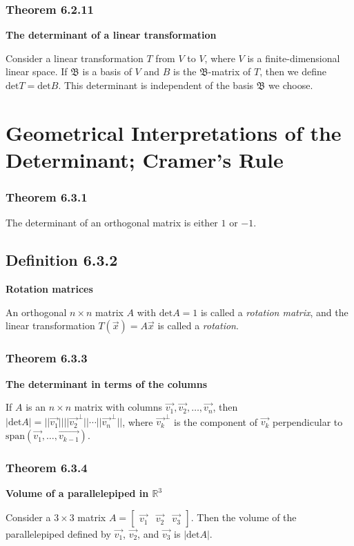 \documentclass{report}
\begin{document}
\subsubsection*{Theorem 6.2.11}
\par\noindent\textbf{The determinant of a linear transformation}
\par\noindent Consider a linear transformation $T$ from $V$ to $V$, where $V$ is a finite-dimensional linear space. If $\mathfrak{B}$ is a basis of $V$ and $B$ is the $\mathfrak{B}$-matrix of $T$, then we define $\textrm{det}T=\textrm{det}B$. This determinant is independent of the basis $\mathfrak{B}$ we choose.

\section{Geometrical Interpretations of the Determinant; Cramer's Rule}
\subsubsection*{Theorem 6.3.1}
\par\noindent The determinant of an orthogonal matrix is either $1$ or $-1$.
\subsection*{Definition 6.3.2}
\par\noindent\textbf{Rotation matrices}
\par\noindent An orthogonal $n\times{}n$ matrix $A$ with $\textrm{det}A=1$ is called a \textit{rotation matrix}, and the linear transformation $T(\vec{x})=A\vec{x}$ is called a \textit{rotation}.
\subsubsection*{Theorem 6.3.3}
\par\noindent\textbf{The determinant in terms of the columns}
\par\noindent If $A$ is an $n\times{}n$ matrix with columns $\vec{v_{1}},\vec{v_{2}},\ldots{},\vec{v_{n}}$, then $|\textrm{det}A|=||\vec{v_{1}}||||\vec{v_{2}}^{\perp}||\cdots{}||\vec{v_{n}}^{\perp}||$, where $\vec{v_{k}}^{\perp}$ is the component of $\vec{v_{k}}$ perpendicular to $\textrm{span}(\vec{v_{1}},\ldots{},\vec{v_{k-1}})$.
\subsubsection*{Theorem 6.3.4}
\par\noindent\textbf{Volume of a parallelepiped in $\mathbb{R}^{3}$}
\par\noindent Consider a $3\times{}3$ matrix $A=\left[\begin{array}{ccc}\vec{v_{1}}&\vec{v_{2}}&\vec{v_{3}}\end{array}\right]$. Then the volume of the parallelepiped defined by $\vec{v_{1}}$, $\vec{v_{2}}$, and $\vec{v_{3}}$ is $|\textrm{det}A|$.
\end{document}
